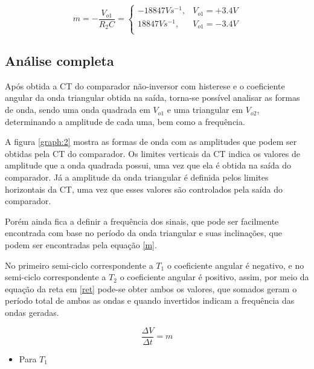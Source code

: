 \begin{equation} \label{m}
m = -\frac{V_{o1}}{R_2 C} = 
\left \{
\begin{array}{cc}
- 18847 Vs^{-1}, & V_{o1} = +3.4 V \\
18847 Vs^{-1}, & V_{o1} = -3.4 V \\
\end{array}
\right.
\end{equation}

\subsection{Análise completa}

Após obtida a CT do comparador não-inversor com histerese e o coeficiente angular da onda triangular obtida na saída, torna-se possível analisar as formas de onda, sendo uma onda quadrada em $V_{o1}$ e uma triangular em $V_{o2}$, determinando a amplitude de cada uma, bem como a frequência.

A figura \ref{graph:2} mostra as formas de onda com as amplitudes que podem ser obtidas pela CT do comparador. Os limites verticais da CT indica os valores de amplitude que a onda quadrada possui, uma vez que ela é obtida na saída do comparador. Já a amplitude da onda triangular é definida pelos limites horizontais da CT, uma vez que esses valores são controlados pela saída do comparador.



Porém ainda fica a definir a frequência dos sinais, que pode ser facilmente encontrada com base no período da onda triangular e suas inclinações, que podem ser encontradas pela equação \ref{m}.

No primeiro semi-ciclo correspondente a $T_1$ o coeficiente angular é negativo, e no semi-ciclo correspondente a $T_2$ o coeficiente angular é positivo, assim, por meio da equação da reta em \ref{ret} pode-se obter ambos os valores, que somados geram o período total de ambas as ondas e quando invertidos indicam a frequência das ondas geradas.

        \begin{equation} \label{ret}
            \frac{\Delta V}{\Delta t} = m
        \end{equation}

\begin{itemize}
    \item Para $T_1$\\
\end{itemize}

